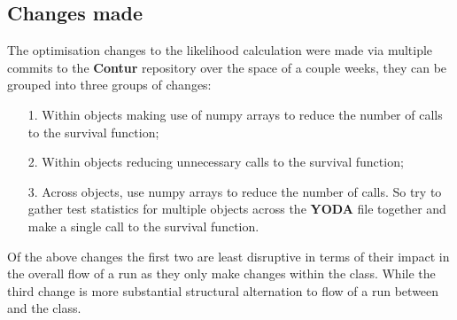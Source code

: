 \subsection{Changes made}
The optimisation changes to the likelihood calculation were made via multiple commits to the \textbf{Contur} repository over the space of a couple weeks, they can be grouped into three groups of changes:

\begin{itemize}
\item[1.] Within  objects making use of numpy arrays to reduce the number of calls to the survival function;
\item[2.] Within  objects reducing unnecessary calls to the survival function;
\item[3.] Across  objects, use numpy arrays to reduce the number of calls. So try to gather test statistics for multiple  objects across the \textbf{YODA} file together and make a single call to the survival function.
\end{itemize}

Of the above changes the first two are least disruptive in terms of their impact in the overall flow of a run as they only make changes within the  class. While the third change is more substantial structural alternation to flow of a run between  and the  class.

